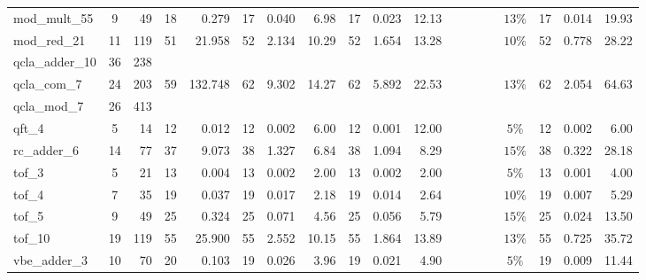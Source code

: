 \begin{table}[H]
\begin{tabular}{l c r | r r | r r r | r r r | c r r r | c r r r}
mod_mult_55 & 9 & 49 & 18 & 0.279 & \cellcolor{bestT}17 & 0.040 & 6.98 & \cellcolor{bestT}17 & 0.023 & 12.13 &  &  &  &  & $13\%$ & \cellcolor{bestT}17 & \cellcolor{bestTime}0.014 & 19.93 \\
mod_red_21 & 11 & 119 & \cellcolor{bestT}51 & 21.958 & 52 & 2.134 & 10.29 & 52 & 1.654 & 13.28 &  &  &  &  & $10\%$ & 52 & \cellcolor{bestTime}0.778 & 28.22 \\
qcla_adder_10 & 36 & 238 &  &  &  &  &  &  &  &  &  &  &  &  &  &  &  &  \\
qcla_com_7 & 24 & 203 & \cellcolor{bestT}59 & 132.748 & 62 & 9.302 & 14.27 & 62 & 5.892 & 22.53 &  &  &  &  & $13\%$ & 62 & \cellcolor{bestTime}2.054 & 64.63 \\
qcla_mod_7 & 26 & 413 &  &  &  &  &  &  &  &  &  &  &  &  &  &  &  &  \\
qft_4 & 5 & 14 & \cellcolor{bestT}12 & 0.012 & \cellcolor{bestT}12 & 0.002 & 6.00 & \cellcolor{bestT}12 & \cellcolor{bestTime}0.001 & 12.00 &  &  &  &  & $5\%$ & \cellcolor{bestT}12 & 0.002 & 6.00 \\
rc_adder_6 & 14 & 77 & \cellcolor{bestT}37 & 9.073 & 38 & 1.327 & 6.84 & 38 & 1.094 & 8.29 &  &  &  &  & $15\%$ & 38 & \cellcolor{bestTime}0.322 & 28.18 \\
tof_3 & 5 & 21 & \cellcolor{bestT}13 & 0.004 & \cellcolor{bestT}13 & 0.002 & 2.00 & \cellcolor{bestT}13 & 0.002 & 2.00 &  &  &  &  & $5\%$ & \cellcolor{bestT}13 & \cellcolor{bestTime}0.001 & 4.00 \\
tof_4 & 7 & 35 & \cellcolor{bestT}19 & 0.037 & \cellcolor{bestT}19 & 0.017 & 2.18 & \cellcolor{bestT}19 & 0.014 & 2.64 &  &  &  &  & $10\%$ & \cellcolor{bestT}19 & \cellcolor{bestTime}0.007 & 5.29 \\
tof_5 & 9 & 49 & \cellcolor{bestT}25 & 0.324 & \cellcolor{bestT}25 & 0.071 & 4.56 & \cellcolor{bestT}25 & 0.056 & 5.79 &  &  &  &  & $15\%$ & \cellcolor{bestT}25 & \cellcolor{bestTime}0.024 & 13.50 \\
tof_10 & 19 & 119 & \cellcolor{bestT}55 & 25.900 & \cellcolor{bestT}55 & 2.552 & 10.15 & \cellcolor{bestT}55 & 1.864 & 13.89 &  &  &  &  & $13\%$ & \cellcolor{bestT}55 & \cellcolor{bestTime}0.725 & 35.72 \\
vbe_adder_3 & 10 & 70 & 20 & 0.103 & \cellcolor{bestT}19 & 0.026 & 3.96 & \cellcolor{bestT}19 & 0.021 & 4.90 &  &  &  &  & $5\%$ & \cellcolor{bestT}19 & \cellcolor{bestTime}0.009 & 11.44 \\
\bottomrule
\end{tabular}
\end{table}
